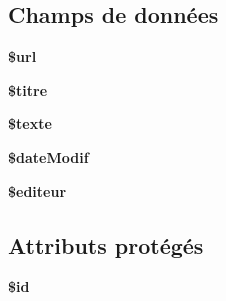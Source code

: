 \subsection*{Champs de données}
\begin{DoxyCompactItemize}
\item 
\hypertarget{class_library_1_1_entities_1_1_page_fixe_acf215f34a917d014776ce684a9ee8909}{{\bfseries \$url}}\label{class_library_1_1_entities_1_1_page_fixe_acf215f34a917d014776ce684a9ee8909}

\item 
\hypertarget{class_library_1_1_entities_1_1_page_fixe_a43e5b5a819fedbd12b8cf5421ba6985e}{{\bfseries \$titre}}\label{class_library_1_1_entities_1_1_page_fixe_a43e5b5a819fedbd12b8cf5421ba6985e}

\item 
\hypertarget{class_library_1_1_entities_1_1_page_fixe_a354cbaf1d3ac02e1d550c110d5f288c3}{{\bfseries \$texte}}\label{class_library_1_1_entities_1_1_page_fixe_a354cbaf1d3ac02e1d550c110d5f288c3}

\item 
\hypertarget{class_library_1_1_entities_1_1_page_fixe_a96baed99a52fb35965ca28ed7b968562}{{\bfseries \$date\+Modif}}\label{class_library_1_1_entities_1_1_page_fixe_a96baed99a52fb35965ca28ed7b968562}

\item 
\hypertarget{class_library_1_1_entities_1_1_page_fixe_aa017d457ae24daab44fc040003f0b42b}{{\bfseries \$editeur}}\label{class_library_1_1_entities_1_1_page_fixe_aa017d457ae24daab44fc040003f0b42b}

\end{DoxyCompactItemize}
\subsection*{Attributs protégés}
\begin{DoxyCompactItemize}
\item 
\hypertarget{class_library_1_1_entities_1_1_page_fixe_ae97941710d863131c700f069b109991e}{{\bfseries \$id}}\label{class_library_1_1_entities_1_1_page_fixe_ae97941710d863131c700f069b109991e}

\end{DoxyCompactItemize}


